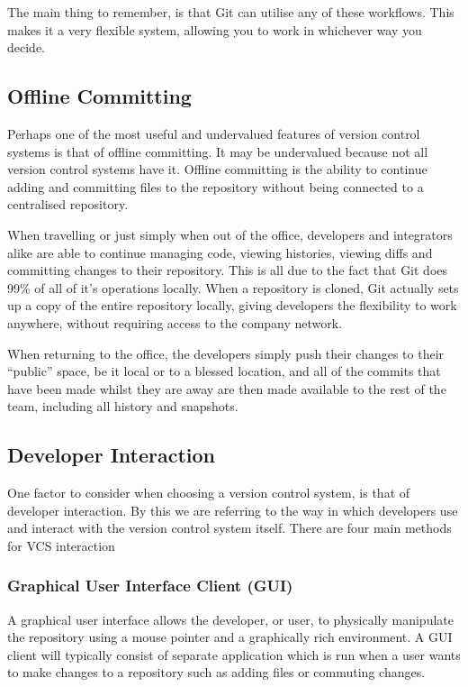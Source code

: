 The main thing to remember, is that Git can utilise any of these workflows.  This makes it a very flexible system, allowing you to work in whichever way you decide.

\subsection{Offline Committing}

Perhaps one of the most useful and undervalued features of version control systems is that of offline committing.  It may be undervalued because not all version control systems have it.  Offline committing is the ability to continue adding and committing files to the repository without being connected to a centralised repository.  

When travelling or just simply when out of the office, developers and integrators alike are able to continue managing code, viewing histories, viewing diffs and committing changes to their repository.  This is all due to the fact that Git does 99\% of all of it's operations locally.  When a repository is cloned, Git actually sets up a copy of the entire repository locally, giving developers the flexibility to work anywhere, without requiring access to the company network.

When returning to the office, the developers simply push their changes to their “public” space, be it local or to a blessed location, and all of the commits that have been made whilst they are away are then made available to the rest of the team, including all history and snapshots.

\subsection{Developer Interaction}

One factor to consider when choosing a version control system, is that of developer interaction.  By this we are referring to the way in which developers use and interact with the version control system itself.  There are four main methods for VCS interaction

\subsubsection{Graphical User Interface Client (GUI)}

A graphical user interface allows the developer, or user, to physically manipulate the repository using a mouse pointer and a graphically rich environment.  A GUI client will typically consist of separate application which is run when a user wants to make changes to a repository such as adding files or commuting changes.  

